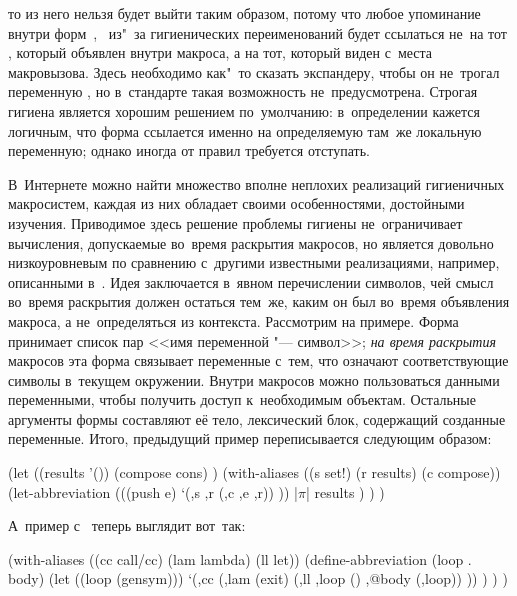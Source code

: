 \noindent
то из него нельзя будет выйти таким образом, потому что любое упоминание
 внутри форм~, \textdots\ из"~за гигиенических
переименований будет ссылаться не~на тот , который объявлен внутри
макроса, а на тот, который виден с~места макровызова. Здесь необходимо как"~то
сказать экспандеру, чтобы он не~трогал переменную , но в~стандарте
{\RnRS} такая возможность не~предусмотрена. Строгая гигиена является хорошим
решением по~умолчанию: в~определении  кажется логичным, что форма
 ссылается именно на определяемую там~же локальную переменную;
однако иногда от правил требуется отступать.

В~Интернете можно найти множество вполне неплохих реализаций гигиеничных
макросистем, каждая из них обладает своими особенностями, достойными изучения.
Приводимое здесь решение проблемы гигиены не~ограничивает вычисления,
допускаемые во~время раскрытия макросов, но является довольно низкоуровневым по
сравнению с~другими известными реализациями, например, описанными
в~\cite{kcr98,dhb93}. Идея заключается в~явном перечислении символов, чей смысл
во~время раскрытия должен остаться тем~же, каким он был во~время объявления
макроса, а не~определяться из контекста. Рассмотрим на примере. Форма
 принимает список пар <<имя переменной "--- символ>>; \emph{на
время раскрытия} макросов эта форма связывает переменные с~тем, что означают
соответствующие символы в~текущем окружении. Внутри макросов можно пользоваться
данными переменными, чтобы получить доступ к~необходимым объектам. Остальные
аргументы формы  составляют её тело, лексический блок,
содержащий созданные переменные. Итого, предыдущий пример переписывается
следующим образом:

\begin{code:lisp}
(let ((results '())
      (compose cons) )
  (with-aliases ((s set!) (r results) (c compose))
    (let-abbreviation (((push e)
                        `(,s ,r (,c ,e ,r)) ))
      |$\pi$|
      results ) ) )
\end{code:lisp}

\noindent
А~пример с~ теперь выглядит вот~так:

\begin{code:lisp}
(with-aliases ((cc call/cc) (lam lambda) (ll let))
  (define-abbreviation (loop . body)
    (let ((loop (gensym)))
      `(,cc (,lam (exit)
               (,ll ,loop () ,@body (,loop)) )) ) ) )
\end{code:lisp}

